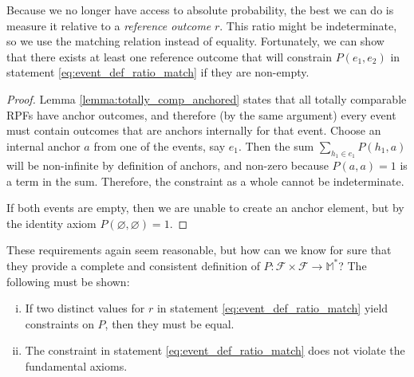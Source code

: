 \documentclass[twoside]{article}
\theoremstyle{plain}%
\theoremstyle{definition}
\theoremstyle{remark}
\begin{document}
Because we no longer have access to absolute probability, the best we can do is measure it relative to a \textit{reference outcome} \(r\). This ratio might be indeterminate, so we use the matching relation instead of equality. Fortunately, we can show that there exists at least one reference outcome that will constrain \(P(e_1, e_2)\) in statement \ref{eq:event_def_ratio_match} if they are non-empty.

\begin{proof} Lemma \ref{lemma:totally_comp_anchored} states that all totally comparable RPFs have anchor outcomes, and therefore (by the same argument) every event must contain outcomes that are anchors internally for that event. Choose an internal anchor \(a\) from one of the events, say \(e_1\). Then the sum \(\sum_{h_1 \in e_1} P(h_1, a)\) will be non-infinite by definition of anchors, and non-zero because \(P(a, a) = 1\) is a term in the sum. Therefore, the constraint as a whole cannot be indeterminate.

If both events are empty, then we are unable to create an anchor element, but by the identity axiom \(P(\varnothing, \varnothing) = 1\).
\end{proof}

These requirements again seem reasonable, but how can we know for sure that they provide a complete and consistent definition of \(P: \mathcal{F} \times \mathcal{F} \rightarrow \mathbb{M}^*\)? The following must be shown:

\begin{enumerate}[(i)]
  \item \label{event_def_proof_1} If two distinct values for \(r\) in statement \ref{eq:event_def_ratio_match} yield constraints on \(P\), then they must be equal.
  \item \label{event_def_proof_2} The constraint in statement \ref{eq:event_def_ratio_match} does not violate the fundamental axioms.
\end{enumerate}
\end{document}
